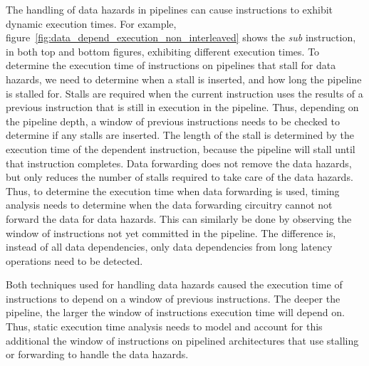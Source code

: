 The handling of data hazards in pipelines can cause instructions to exhibit dynamic execution times.  
For example, figure~\ref{fig:data_depend_execution_non_interleaved} shows the \emph{sub} instruction, in both top and bottom figures, exhibiting different execution times. 
To determine the execution time of instructions on pipelines that stall for data hazards, we need to determine when a stall is inserted, and how long the pipeline is stalled for.
Stalls are required when the current instruction uses the results of a previous instruction that is still in execution in the pipeline.
Thus, depending on the pipeline depth, a window of previous instructions needs to be checked to determine if any stalls are inserted.     
The length of the stall is determined by the execution time of the dependent instruction, because the pipeline will stall until that instruction completes.
Data forwarding does not remove the data hazards, but only reduces the number of stalls required to take care of the data hazards.  
Thus, to determine the execution time when data forwarding is used, timing analysis needs to determine when the data forwarding circuitry cannot not forward the data for data hazards.
This can similarly be done by observing the window of instructions not yet committed in the pipeline.  
The difference is, instead of all data dependencies, only data dependencies from long latency operations need to be detected.

Both techniques used for handling data hazards caused the execution time of instructions to depend on a window of previous instructions.
The deeper the pipeline, the larger the window of instructions execution time will depend on. 
Thus, static execution time analysis needs to model and account for this additional the window of instructions on pipelined architectures that use stalling or forwarding to handle the data hazards. 

